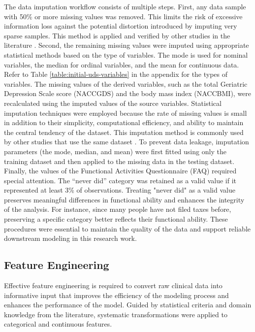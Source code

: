The data imputation workflow consists of multiple steps. First, any data sample with 50\% or more missing values was removed. This limits the risk of excessive information loss against the potential distortion introduced by imputing very sparse samples. This method is applied and verified by other studies in the literature \cite{abbas2024Explainable, Vyas2022Identifying}. Second, the remaining missing values were imputed using appropriate statistical methods based on the type of variables. The mode is used for nominal variables, the median for ordinal variables, and the mean for continuous data. Refer to Table \ref{table:initial-uds-variables} in the appendix for the types of variables. The missing values of the derived variables, such as the total Geriatric Depression Scale score (NACCGDS) and the body mass index (NACCBMI), were recalculated using the imputed values of the source variables. Statistical imputation techniques were employed because the rate of missing values is small in addition to their simplicity, computational efficiency, and ability to maintain the central tendency of the dataset. This imputation method is commonly used by other studies that use the same dataset \cite{abbas2024Explainable, Wang2018Predictive}. To prevent data leakage, imputation parameters (the mode, median, and mean) were first fitted using only the training dataset and then applied to the missing data in the testing dataset. Finally, the values of the Functional Activities Questionnaire (\acrshort{FAQ}) required special attention. The “never did” category was retained as a valid value if it represented at least 3\% of observations. Treating "never did" as a valid value preserves meaningful differences in functional ability and enhances the integrity of the analysis. For instance, since many people have not filed taxes before, preserving a specific category better reflects their functional ability. These procedures were essential to maintain the quality of the data and support reliable downstream modeling in this research work.

\subsection{Feature Engineering}
Effective feature engineering is required to convert raw clinical data into informative input that improves the efficiency of the modeling process and enhances the performance of the model. Guided by statistical criteria and domain knowledge from the literature, systematic transformations were applied to categorical and continuous features.

